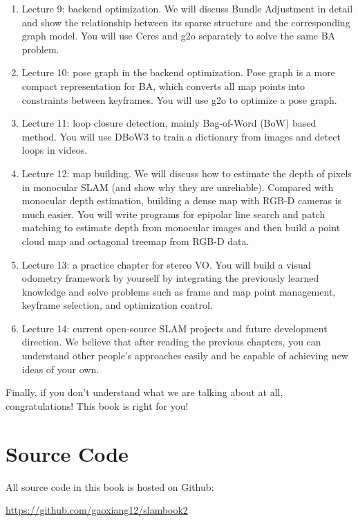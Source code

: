 \begin{enumerate}
	\item Lecture 9: backend optimization. We will discuss Bundle Adjustment in detail and show the relationship between its sparse structure and the corresponding graph model. You will use Ceres and g2o separately to solve the same BA problem.
	
	\item Lecture 10: pose graph in the backend optimization. Pose graph is a more compact representation for BA, which converts all map points into constraints between keyframes. You will use g2o to optimize a pose graph.
	
	\item Lecture 11: loop closure detection, mainly Bag-of-Word (BoW) based method. You will use DBoW3 to train a dictionary from images and detect loops in videos. 
	
	\item Lecture 12: map building. We will discuss how to estimate the depth of pixels in monocular SLAM  (and show why they are unreliable). Compared with monocular depth estimation, building a dense map with RGB-D cameras is much easier. You will write programs for epipolar line search and patch matching to estimate depth from monocular images and then build a point cloud map and octagonal treemap from RGB-D data.
	
	\item Lecture 13: a practice chapter for stereo VO. You will build a visual odometry framework by yourself by integrating the previously learned knowledge and solve problems such as frame and map point management, keyframe selection, and optimization control.
	
	\item Lecture 14: current open-source SLAM projects and future development direction. We believe that after reading the previous chapters, you can understand other people's approaches easily and be capable of achieving new ideas of your own.
\end{enumerate}

Finally, if you don't understand what we are talking about at all, congratulations! This book is right for you! 

\section{Source Code}

All source code in this book is hosted on Github:

{\hfill\url{https://github.com/gaoxiang12/slambook2}\hfill}

